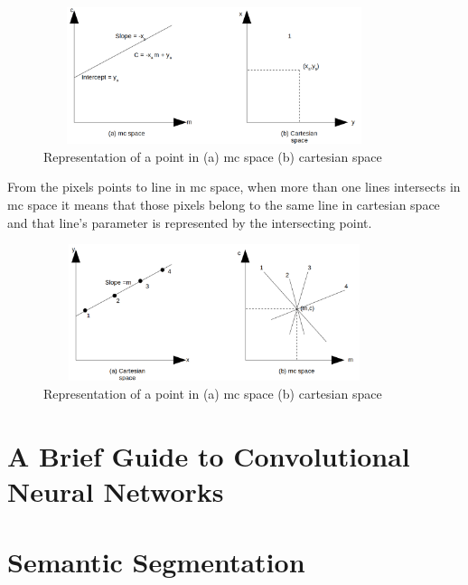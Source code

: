                     \begin{figure}[h]
    \centering
    \includegraphics[width=10cm, height =4cm]{images/hough2.png}
    \caption{Representation of a point in (a) mc space (b) cartesian space}
    \end{figure}
    
    From the pixels points to line in mc space, when more than one lines intersects in mc space it means that those pixels belong to the same line in cartesian space and that line's parameter is represented by the intersecting point. 
    
                 \begin{figure}[h]
    \centering
    \includegraphics[width=10cm, height =4cm]{images/hough3.png}
    \caption{Representation of a point in (a) mc space (b) cartesian space}
    \end{figure}
    
    \section{A Brief Guide to Convolutional Neural Networks}
    
    \section{Semantic Segmentation}
    

